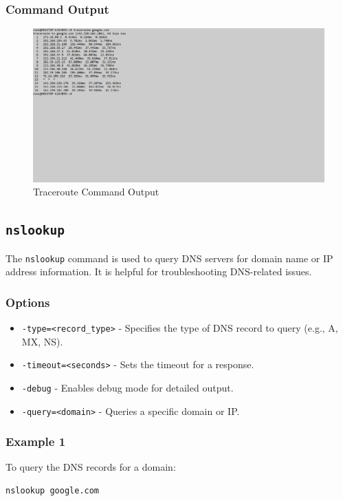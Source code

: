 \documentclass{article}
\begin{document}
\subsubsection{Command Output}
\begin{figure}[htbp]
    \centering
    \includegraphics[]{traceroute.png}
    \caption{Traceroute Command Output}
    \label{fig:traceroute_output}
\end{figure}

\clearpage  %
\subsection{\texttt{nslookup}}
The \texttt{nslookup} command is used to query DNS servers for domain name or IP address information. It is helpful for troubleshooting DNS-related issues.

\subsubsection{Options}
\begin{itemize}
    \item \texttt{-type=\textless record\_type\textgreater} - Specifies the type of DNS record to query (e.g., A, MX, NS).
    \item \texttt{-timeout=\textless seconds\textgreater} - Sets the timeout for a response.
    \item \texttt{-debug} - Enables debug mode for detailed output.
    \item \texttt{-query=\textless domain\textgreater} - Queries a specific domain or IP.
\end{itemize}

\subsubsection{Example 1}
To query the DNS records for a domain:
\begin{verbatim}
nslookup google.com
\end{verbatim}
\end{document}

